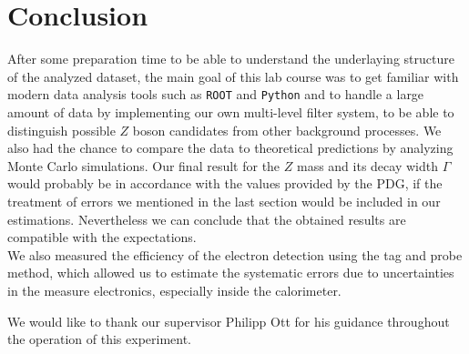 \documentclass[twocolumn,
			   showpacs,%
               nofootinbib,
               aps,%
               prd,
               notitlepage,
               showkeys,
               10pt]{revtex4-1}
\begin{document}
\section{Conclusion}
After some preparation time to be able to understand the underlaying structure of the analyzed dataset, the main goal of this lab course was to get familiar with modern data analysis tools such as \verb|ROOT| and \verb|Python| and to handle a large amount of data by implementing our own multi-level filter system, to be able to distinguish possible $Z$ boson candidates from other background processes. We also had the chance to compare the data to theoretical predictions by analyzing Monte Carlo simulations. Our final result for the $Z$ mass and its decay width $\Gamma$ would probably be in accordance with the values provided by the PDG, if the treatment of errors we mentioned in the last section would be included in our estimations. Nevertheless we can conclude that the obtained results are compatible with the expectations.\\
We also measured the efficiency of the electron detection using the tag and probe method, which allowed us to estimate the systematic errors due to uncertainties in the measure electronics, especially inside the calorimeter.\\
 
\begin{acknowledgments}
We would like to thank our supervisor Philipp Ott for his guidance throughout the operation of this experiment.
\end{acknowledgments}



\nocite{*}
\end{document}
